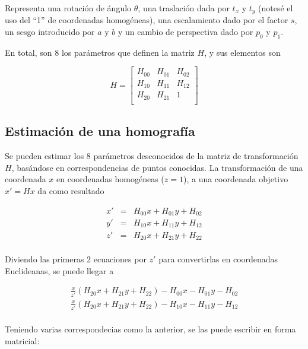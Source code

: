 \documentclass[a4paper,10pt]{article}
\begin{document}
Representa una rotación de ángulo $\theta$, una traslación dada por $t_{x}$ y $t_{y}$ (notesé el uso del ``1'' de coordenadas
homogéneas), una escalamiento dado por el factor $s$, un sesgo introducido por $a$ y $b$ y un cambio de perspectiva
dado por $p_{0}$ y $p_{1}$.

En total, son 8 los parámetros que definen la matriz $H$, y sus elementos son

\begin{equation}
    H =
    \begin{bmatrix}
        H_{00} & H_{01} & H_{02}\\
        H_{10} & H_{11} & H_{12}\\
        H_{20} & H_{21} & 1\\
    \end{bmatrix}
\end{equation}

\subsection{Estimación de una homografía}

Se pueden estimar los 8 parámetros desconocidos de la matriz de transformación $H$, basándose en correspondencias de puntos conocidas.
La transformación de una coordenada $x$ en coordenadas homogéneas ($z=1$), a una coordenada objetivo $x'= Hx$ da como resultado

\begin{eqnarray*}
    x' &=& H_{00}x + H_{01}y + H_{02}\\
    y' &=& H_{10}x + H_{11}y + H_{12}\\
    z' &=& H_{20}x + H_{21}y + H_{22}\\
\end{eqnarray*}

Diviendo las primeras 2 ecuaciones por $z'$ para convertirlas en coordenadas Euclideanas, se puede llegar a

\begin{eqnarray*}
    \frac{x}{z'}(H_{20}x + H_{21}y + H_{22}) - H_{00}x - H_{01}y - H_{02}\\
    \frac{x}{z'}(H_{20}x + H_{21}y + H_{22}) - H_{10}x - H_{11}y - H_{12}\\
\end{eqnarray*}

Teniendo varias correspondecias como la anterior, se las puede escribir en forma matricial:
\end{document}
